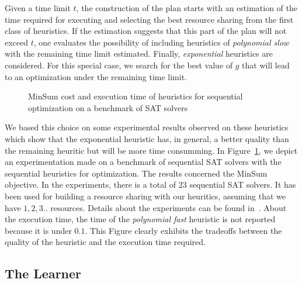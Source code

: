Given a time limit $t$, the construction of the plan starts with an estimation of the time 
required for executing and selecting the best resource sharing from the first class of heuristics. If the estimation
suggests that this part of the plan will not exceed $t$, one evaluates the possibility of including heuristics 
of \textit{polynomial slow} with the remaining time limit estimated. Finally, \textit{exponential} heuristics are 
considered. For this special case, we search for the best value of $g$ that will lead to an optimization under 
the remaining time limit.

\begin{figure}[ht]
\centering
{}
\caption{MinSum cost and execution time of heuristics for sequential optimization 
on a benchmark of SAT solvers}
\label{ObjOptimizer}
\end{figure}

We based this choice on some experimental results observed on these heuristics which show that the exponential 
heuristic has, in general, a better quality than the remaining heuritic but will be more time consumming. 
In Figure~\ref{ObjOptimizer}, we depict an experimentation made on a benchmark of sequential SAT solvers 
with the sequential heuristics for optimization. The results concerned the MinSum objective. In the 
experiments, there is a total of $23$ sequential SAT solvers. It has been used for building a resource sharing 
with our heuritics, assuming that we have  $1, 2, 3..$ resources. Details about the experiments 
can be found in~\cite{RRJEA}. About the execution time, the time of the  \textit{polynomial fast} heuristic is not 
reported because it is under $0.1$. This Figure clearly exhibits the tradeoffs between the quality of the 
heuristic and the execution time required.

\subsection{The Learner}

